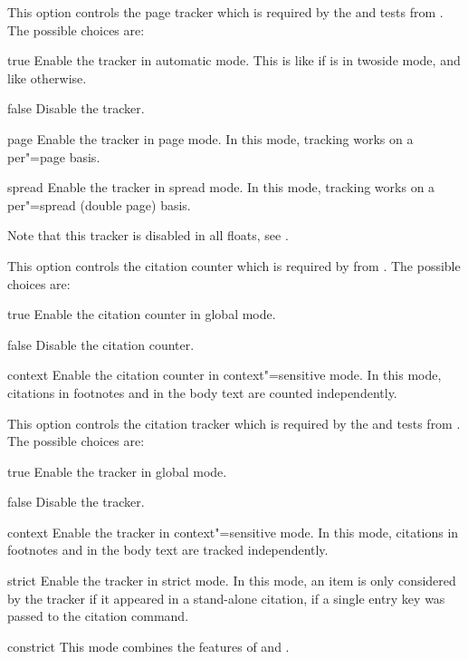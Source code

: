 \documentclass{ltxdockit}[2011/03/25]
\begin{document}
\begin{optionlist}


This option controls the page tracker which is required by the  and  tests from . The possible choices are:

\begin{valuelist}
\item[true] Enable the tracker in automatic mode. This is like  if \latex is in twoside mode, and like  otherwise.
\item[false] Disable the tracker.
\item[page] Enable the tracker in page mode. In this mode, tracking works on a per"=page basis.
\item[spread] Enable the tracker in spread mode. In this mode, tracking works on a per"=spread (double page) basis.
\end{valuelist}

Note that this tracker is disabled in all floats, see .


This option controls the citation counter which is required by  from . The possible choices are:

\begin{valuelist}
\item[true] Enable the citation counter in global mode.
\item[false] Disable the citation counter.
\item[context] Enable the citation counter in context"=sensitive mode. In this mode, citations in footnotes and in the body text are counted independently.
\end{valuelist}


This option controls the citation tracker which is required by the  and  tests from . The possible choices are:

\begin{valuelist}
\item[true] Enable the tracker in global mode.
\item[false] Disable the tracker.
\item[context] Enable the tracker in context"=sensitive mode. In this mode, citations in footnotes and in the body text are tracked independently.
\item[strict] Enable the tracker in strict mode. In this mode, an item is only considered by the tracker if it appeared in a stand-alone citation, \ie if a single entry key was passed to the citation command.
\item[constrict] This mode combines the features of  and .
\end{valuelist}


\end{optionlist}
\end{document}
